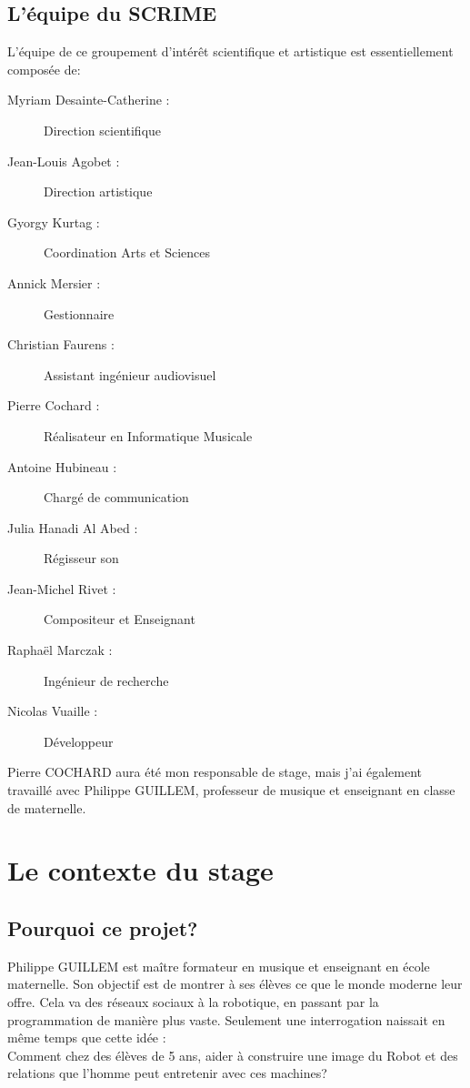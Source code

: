 \documentclass[a4paper, 12pt]{report}
\begin{document}
\subsection{L'équipe du SCRIME}
L'équipe de ce groupement d'intérêt scientifique et artistique est essentiellement composée de:
\begin{description}
\item[Myriam Desainte-Catherine :] Direction scientifique
\item[Jean-Louis Agobet :] Direction artistique
\item[Gyorgy Kurtag :] Coordination Arts et Sciences
\item[Annick Mersier :] Gestionnaire
\item[Christian Faurens :] Assistant ingénieur audiovisuel
\item[Pierre Cochard :] Réalisateur en Informatique Musicale
\item[Antoine Hubineau :] Chargé de communication
\item[Julia Hanadi Al Abed :] Régisseur son
\item[Jean-Michel Rivet :] Compositeur et Enseignant
\item[Raphaël Marczak :] Ingénieur de recherche
\item[Nicolas Vuaille :] Développeur
\end{description}
Pierre COCHARD  aura été mon responsable de stage, mais j'ai également travaillé avec Philippe GUILLEM, professeur de musique et enseignant en classe de maternelle.

\section{Le contexte du stage}
\subsection{Pourquoi ce projet?}

Philippe GUILLEM est maître formateur en musique et enseignant en école maternelle. Son objectif est de montrer à ses élèves ce que le monde moderne leur offre. Cela va des réseaux sociaux à la robotique, en passant par la programmation de manière plus vaste. Seulement une interrogation naissait en même temps que cette idée :\\

Comment chez des élèves de 5 ans, aider à construire une image du Robot et des relations que l'homme peut entretenir avec ces machines?\\
\end{document}
